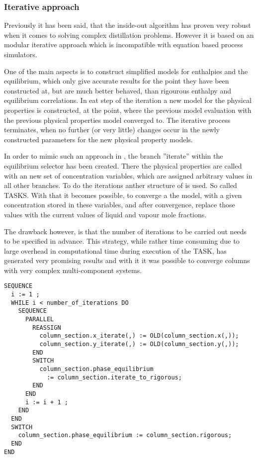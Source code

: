     \subsubsection{Iterative approach}
        Previously it has been said, that the inside-out algorithm has proven very robust when
        it comes to solving complex distillation problems. However it is based on an modular
        iterative approach which is incompatible with equation based process simulators.

        One of the main aspects is to construct simplified models for enthalpies and the equilibrium,
        which only give accurate results for the point they have been constructed at, but are much
        better behaved, than rigourous enthalpy and equilibrium correlations. In eat step of the iteration
        a new model for the physical properties is constructed, at the point, where the previous model
        evaluation with the previous physical properties model converged to. The iterative process terminates,
        when no further (or very little) changes occur in the newly constructed parameters for the
        new physical property models.

        In order to mimic such an approach in \gproms, the branch ''iterate'' within the equilibrium
        selector has been created. There the physical properties are called with an new set of concentration
        variables, which are assigned arbitrary values in all other branches. To do the iterations anther
        structure of \gproms is used. So called TASKS. With that it becomes possible, to converge
        a the model, with a given concentration stored in these variables, and after convergence, replace those
        values with the current values of liquid and vapour mole fractions.

        The drawback however, is that the number of iterations to be carried out needs to be specified in
        advance. This strategy, while rather time consuming due to large overhead in computational time
        during execution of the TASK, has generated very promising results and with it it was possible
        to converge columns with very complex multi-component systems.
\begin{lstlisting}
SEQUENCE
  i := 1 ;
  WHILE i < number_of_iterations DO
    SEQUENCE
      PARALLEL
        REASSIGN
          column_section.x_iterate(,) := OLD(column_section.x(,));
          column_section.y_iterate(,) := OLD(column_section.y(,));
        END
        SWITCH
          column_section.phase_equilibrium
            := column_section.iterate_to_rigorous;
        END
      END
      i := i + 1 ;
    END
  END
  SWITCH
    column_section.phase_equilibrium := column_section.rigorous;
  END
END
\end{lstlisting}
